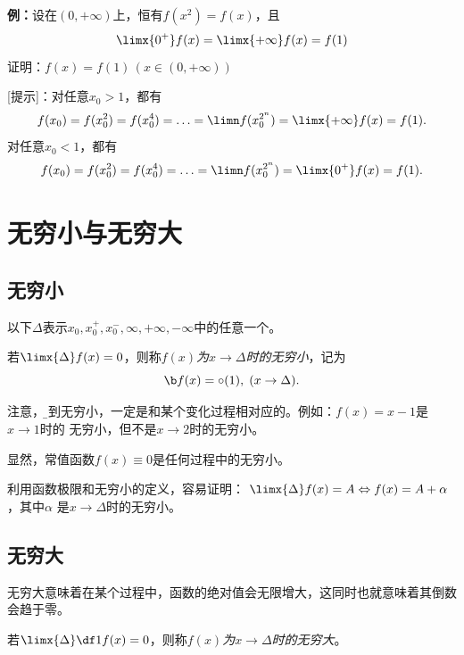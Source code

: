 {\bf 例：}设在$(0,+\infty)$上，恒有$f(x^2)=f(x)$，且
$$\limx{0^+}f(x)=\limx{+\infty}f(x)=f(1)$$
证明：$f(x)=f(1)\,(x\in(0,+\infty))$

[提示]：对任意$x_0>1$，都有
$$f(x_0)=f(x_0^2)=f(x_0^4)=\ldots=\limn f(x_0^{2^n})=\limx{+\infty}f(x)=f(1).$$
对任意$x_0<1$，都有
$$f(x_0)=f(x_0^2)=f(x_0^4)=\ldots=\limn f(x_0^{2^n})=\limx{0^+}f(x)=f(1).$$

\section{无穷小与无穷大}

\subsection{无穷小}

以下$\Delta$表示$x_0,x_0^+,x_0^-,\infty,+\infty,-\infty$中的任意一个。

\begin{thx}
	若$\limx{\Delta}f(x)=0$，则称{\it $f(x)$为$x\to\Delta$时的无穷小}，记为
	$${\b f(x)=\circ(1),\;(x\to\Delta).}$$
\end{thx}

注意，{\b 谈到无穷小，一定是和某个变化过程相对应的}。例如：$f(x)=x-1$是$x\to 1$时的
无穷小，但不是$x\to 2$时的无穷小。

显然，常值函数$f(x)\equiv 0$是任何过程中的无穷小。

利用函数极限和无穷小的定义，容易证明：
$\limx{\Delta}f(x)=A\Leftrightarrow f(x)=A+\alpha$，其中$\alpha$
  是$x\to\Delta$时的无穷小。

\subsection{无穷大}

无穷大意味着在某个过程中，函数的绝对值会无限增大，这同时也就意味着其倒数会趋于零。

\begin{thx}
	若$\limx{\Delta}\df1{f(x)}=0$，则称{\it $f(x)$为$x\to\Delta$时的无穷大}。
\end{thx}

